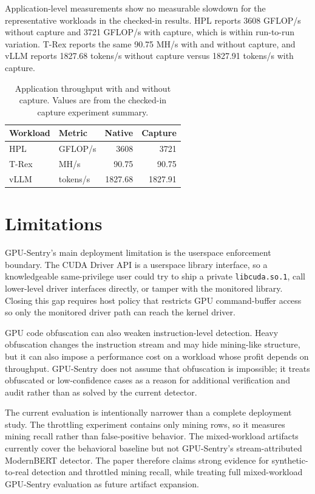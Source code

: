 Application-level measurements show no measurable slowdown for the representative workloads in the checked-in results. HPL reports 3608 GFLOP/s without capture and 3721 GFLOP/s with capture, which is within run-to-run variation. T-Rex reports the same 90.75 MH/s with and without capture, and vLLM reports 1827.68 tokens/s without capture versus 1827.91 tokens/s with capture.

\begin{table}[t]
    \centering
    \caption{Application throughput with and without capture. Values are from the checked-in capture experiment summary.}
    \label{tab:app_overhead}
    \footnotesize
    \begin{tabular}{llrr}
        \toprule
        Workload & Metric & Native & Capture \\
        \midrule
        HPL & GFLOP/s & 3608 & 3721 \\
        T-Rex & MH/s & 90.75 & 90.75 \\
        vLLM & tokens/s & 1827.68 & 1827.91 \\
        \bottomrule
    \end{tabular}
\end{table}

\section{Limitations}
\label{sec:limitations}

GPU-Sentry's main deployment limitation is the userspace enforcement boundary. The CUDA Driver API is a userspace library interface, so a knowledgeable same-privilege user could try to ship a private \texttt{libcuda.so.1}, call lower-level driver interfaces directly, or tamper with the monitored library. Closing this gap requires host policy that restricts GPU command-buffer access so only the monitored driver path can reach the kernel driver.

GPU code obfuscation can also weaken instruction-level detection. Heavy obfuscation changes the instruction stream and may hide mining-like structure, but it can also impose a performance cost on a workload whose profit depends on throughput. GPU-Sentry does not assume that obfuscation is impossible; it treats obfuscated or low-confidence cases as a reason for additional verification and audit rather than as solved by the current detector.

The current evaluation is intentionally narrower than a complete deployment study. The throttling experiment contains only mining rows, so it measures mining recall rather than false-positive behavior. The mixed-workload artifacts currently cover the behavioral baseline but not GPU-Sentry's stream-attributed ModernBERT detector. The paper therefore claims strong evidence for synthetic-to-real detection and throttled mining recall, while treating full mixed-workload GPU-Sentry evaluation as future artifact expansion.

